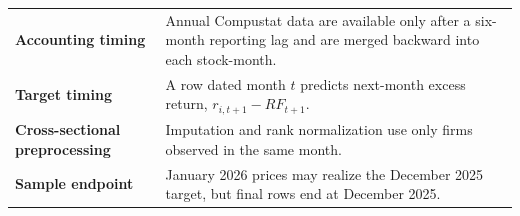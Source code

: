 \documentclass[11pt,a4paper]{article}
\begin{document}
\vspace{0.4cm}

\begin{center}
\begin{tabular}{p{4.2cm}p{10.2cm}}
\textbf{Accounting timing} & Annual Compustat data are available only after a six-month reporting lag and are merged backward into each stock-month.\\[0.2cm]
\textbf{Target timing} & A row dated month $t$ predicts next-month excess return, $r_{i,t+1}-RF_{t+1}$.\\[0.2cm]
\textbf{Cross-sectional preprocessing} & Imputation and rank normalization use only firms observed in the same month.\\[0.2cm]
\textbf{Sample endpoint} & January 2026 prices may realize the December 2025 target, but final rows end at December 2025.\\
\end{tabular}
\end{center}
\end{document}
